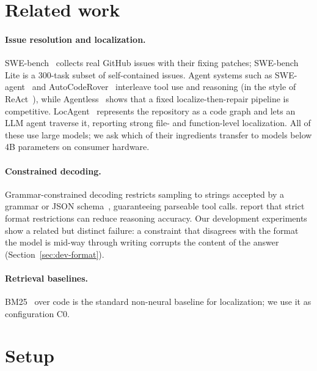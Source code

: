 \documentclass[11pt]{article}
\begin{document}
\section{Related work}
\label{sec:related}

\paragraph{Issue resolution and localization.}
SWE-bench~\cite{jimenez2024swebench} collects real GitHub issues with their fixing patches; SWE-bench Lite is a 300-task subset of self-contained issues.
Agent systems such as SWE-agent~\cite{yang2024sweagent} and AutoCodeRover~\cite{zhang2024autocoderover} interleave tool use and reasoning (in the style of ReAct~\cite{yao2023react}), while Agentless~\cite{xia2024agentless} shows that a fixed localize-then-repair pipeline is competitive.
LocAgent~\cite{chen2025locagent} represents the repository as a code graph and lets an LLM agent traverse it, reporting strong file- and function-level localization.
All of these use large models; we ask which of their ingredients transfer to models below 4B parameters on consumer hardware.

\paragraph{Constrained decoding.}
Grammar-constrained decoding restricts sampling to strings accepted by a grammar or JSON schema~\cite{geng2023grammar,willard2023outlines}, guaranteeing parseable tool calls.
\citet{tam2024speak} report that strict format restrictions can reduce reasoning accuracy.
Our development experiments show a related but distinct failure: a constraint that disagrees with the format the model is mid-way through writing corrupts the content of the answer (Section~\ref{sec:dev-format}).

\paragraph{Retrieval baselines.}
BM25~\cite{robertson2009bm25} over code is the standard non-neural baseline for localization; we use it as configuration C0.

\section{Setup}
\label{sec:setup}
\end{document}
